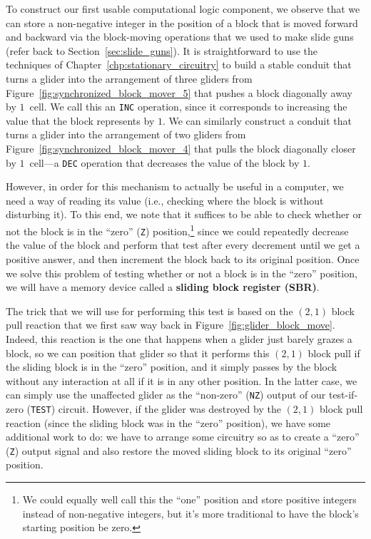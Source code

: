 To construct our first usable computational logic component, we observe that we can store a non-negative integer in the position of a block that is moved forward and backward via the block-moving operations that we used to make slide guns (refer back to Section~\ref{sec:slide_guns}). It is straightforward to use the techniques of Chapter~\ref{chp:stationary_circuitry} to build a stable conduit that turns a glider into the arrangement of three gliders from Figure~\ref{fig:synchronized_block_mover_5} that pushes a block diagonally away by $1$~cell. We call this an \texttt{INC} operation, since it corresponds to increasing the value that the block represents by $1$. We can similarly construct a conduit that turns a glider into the arrangement of two gliders from Figure~\ref{fig:synchronized_block_mover_4} that pulls the block diagonally closer by $1$~cell---a \texttt{DEC} operation that decreases the value of the block by $1$.

However, in order for this mechanism to actually be useful in a computer, we need a way of reading its value (i.e., checking where the block is without disturbing it). To this end, we note that it suffices to be able to check whether or not the block is in the ``zero'' (\texttt{Z}) position,\footnote{We could equally well call this the ``one'' position and store positive integers instead of non-negative integers, but it's more traditional to have the block's starting position be zero.} since we could repeatedly decrease the value of the block and perform that test after every decrement until we get a positive answer, and then increment the block back to its original position. Once we solve this problem of testing whether or not a block is in the ``zero'' position, we will have a memory device called a \textbf{sliding block register (SBR)}.

The trick that we will use for performing this test is based on the $(2,1)$ block pull reaction that we first saw way back in Figure~\ref{fig:glider_block_move}. Indeed, this reaction is the one that happens when a glider just barely grazes a block, so we can position that glider so that it performs this $(2,1)$ block pull if the sliding block is in the ``zero'' position, and it simply passes by the block without any interaction at all if it is in any other position. In the latter case, we can simply use the unaffected glider as the ``non-zero'' (\texttt{NZ}) output of our test-if-zero (\texttt{TEST}) circuit. However, if the glider was destroyed by the $(2,1)$ block pull reaction (since the sliding block was in the ``zero'' position), we have some additional work to do: we have to arrange some circuitry so as to create a ``zero'' (\texttt{Z}) output signal and also restore the moved sliding block to its original ``zero'' position.

